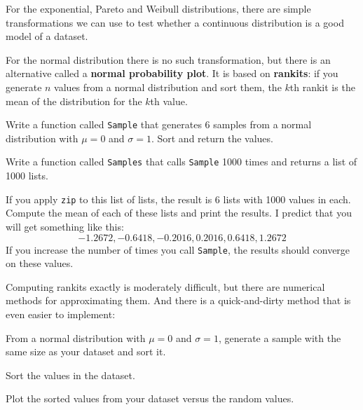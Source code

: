 \documentclass[12pt]{book}
\begin{document}

For the exponential, Pareto and Weibull distributions, there are
simple transformations we can use to test whether a continuous
distribution is a good model of a dataset.


For the normal distribution there is no such transformation, but there
is an alternative called a {\bf normal probability plot}.  It is based
on {\bf rankits}: if you generate $n$ values from a normal
distribution and sort them, the $k$th rankit is the mean of the
distribution for the $k$th value.


\begin{exercise}
Write a function called {\tt Sample} that generates 6 samples from a
normal distribution with $\mu = 0$ and $\sigma = 1$.  Sort and return
the values.

Write a function called {\tt Samples} that calls {\tt Sample} 1000 times and
returns a list of 1000 lists.

If you apply {\tt zip} to this list of lists, the result is 6 lists
with 1000 values in each.  Compute the mean of each of these lists
and print the results.  I predict that you will get something like
this:
%
\[ -1.2672,   -0.6418,   -0.2016,   0.2016,   0.6418,   1.2672 \]
%
If you increase the number of times you call {\tt Sample}, the
results should converge on these values.

\end{exercise}


Computing rankits exactly is moderately difficult, but there are
numerical methods for approximating them.  And there is a
quick-and-dirty method that is even easier to implement:

\begin{description}

\item From a normal distribution with $\mu = 0$ and $\sigma = 1$,
generate a sample with the same size as your dataset and sort it.

\item Sort the values in the dataset.

\item Plot the sorted values from your dataset versus the random values.

\end{description}
\end{document}
